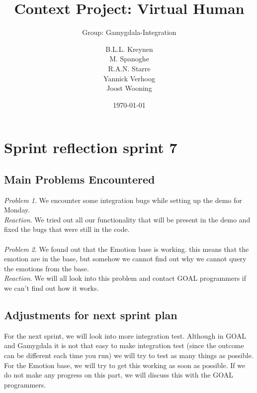 \documentclass{scrartcl}
\begin{document}
\title{Context Project: Virtual Human}
\subtitle{Group: Gamygdala-Integration}
\date{\today{}}

\author{
    \begin{tabular}{l r}
      B.L.L. Kreynen\\
      M. Spanoghe\\
      R.A.N. Starre\\
      Yannick Verhoog\\
      Joost Wooning\\
    \end{tabular}
}

\maketitle \thispagestyle{empty} \pagebreak

\section{Sprint reflection sprint 7}

\subsection{Main Problems Encountered}

\emph{Problem 1}. We encounter some integration bugs while setting up the demo for Monday.\\
\emph{Reaction}. We tried out all our functionality that will be present in the demo and fixed the bugs that were still in the code.\\
\\
\emph{Problem 2}. We found out that the Emotion base is working. this means that the emotion are in the base, but somehow we cannot find out why we cannot query the emotions from the base.\\
\emph{Reaction}. We will all look into this problem and contact GOAL programmers if we can't find out how it works.\\


\subsection{Adjustments for next sprint plan}
For the next sprint, we will look into more integration test. Although in GOAL and Gamygdala it is not that easy to make integration test (since the outcome can be different each time you run) we will try to test as many things as possible. For the Emotion base, we will try to get this working as soon as possible. If we do not make any progress on this part, we will discuss this with the GOAL programmers.
\end{document}

